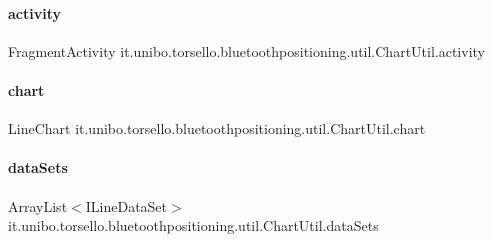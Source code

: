 \paragraph{\texorpdfstring{activity}{activity}}
{\footnotesize\ttfamily Fragment\+Activity it.\+unibo.\+torsello.\+bluetoothpositioning.\+util.\+Chart\+Util.\+activity\hspace{0.3cm}{\ttfamily [private]}}

\hypertarget{classit_1_1unibo_1_1torsello_1_1bluetoothpositioning_1_1util_1_1ChartUtil_a6c34176fdfb85bac1d3aa1529b49ad5f_a6c34176fdfb85bac1d3aa1529b49ad5f}{}\label{classit_1_1unibo_1_1torsello_1_1bluetoothpositioning_1_1util_1_1ChartUtil_a6c34176fdfb85bac1d3aa1529b49ad5f_a6c34176fdfb85bac1d3aa1529b49ad5f} 
\paragraph{\texorpdfstring{chart}{chart}}
{\footnotesize\ttfamily Line\+Chart it.\+unibo.\+torsello.\+bluetoothpositioning.\+util.\+Chart\+Util.\+chart\hspace{0.3cm}{\ttfamily [private]}}

\hypertarget{classit_1_1unibo_1_1torsello_1_1bluetoothpositioning_1_1util_1_1ChartUtil_aa98bcaa2d5ba444b91cdc029768d380a_aa98bcaa2d5ba444b91cdc029768d380a}{}\label{classit_1_1unibo_1_1torsello_1_1bluetoothpositioning_1_1util_1_1ChartUtil_aa98bcaa2d5ba444b91cdc029768d380a_aa98bcaa2d5ba444b91cdc029768d380a} 
\paragraph{\texorpdfstring{data\+Sets}{dataSets}}
{\footnotesize\ttfamily Array\+List$<$I\+Line\+Data\+Set$>$ it.\+unibo.\+torsello.\+bluetoothpositioning.\+util.\+Chart\+Util.\+data\+Sets\hspace{0.3cm}{\ttfamily [private]}}

